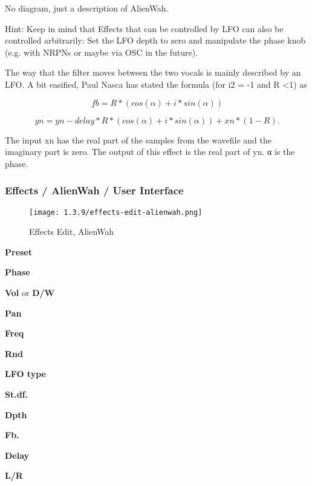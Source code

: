    No diagram, just a description of AlienWah.

   Hint: Keep in mind that Effects that can be controlled by LFO can also be
   controlled arbitrarily: Set the LFO depth to zero and manipulate the phase
   knob (e.g. with NRPNs or maybe via OSC in the future).

   The way that the filter moves between the two vocals is mainly described
   by an LFO. A bit easified, Paul Nasca has stated the formula (for
   i2 = -1 and R \textless 1) as

   \[fb=R*(cos(α)+i*sin(α))\]

   \[yn=yn-delay*R*(cos(α)+i*sin(α))+xn*(1-R).\]

   The input xn has the real part of the samples from the wavefile and the
   imaginary part is zero. The output of this effect is the real part of yn.
   α is the phase.

\subsubsection{Effects / AlienWah / User Interface}
\label{subsubsec:effects_edit_alienwah_ui}

\begin{figure}[H]
   \centering 
   \texttt{[image: 1.3.9/effects-edit-alienwah.png]}
   \caption{Effects Edit, AlienWah}
   \label{fig:effects_edit_alienwah}
\end{figure}

   \begin{enumber}
      \item \textbf{Preset}
      \item \textbf{Phase}
      \item \textbf{Vol} or \textbf{D/W}
      \item \textbf{Pan}
      \item \textbf{Freq}
      \item \textbf{Rnd}
      \item \textbf{LFO type}
      \item \textbf{St.df.}
      \item \textbf{Dpth}
      \item \textbf{Fb.}
      \item \textbf{Delay}
      \item \textbf{L/R}
   \end{enumber}

   \setcounter{ItemCounter}{0}      %

